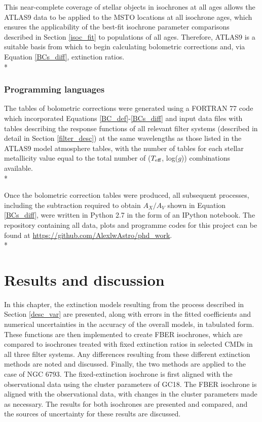 \documentclass[12pt, a4paper]{report}
\begin{document}
This near-complete coverage of stellar objects in isochrones at all ages allows the ATLAS9 data to be applied to the MSTO locations at all isochrone ages, which ensures the applicability of the best-fit isochrone parameter comparisons described in Section \ref{isoc_fit} to populations of all ages. Therefore, ATLAS9 is a suitable basis from which to begin calculating bolometric corrections and, via Equation \ref{BCs_diff}, extinction ratios. \\*



\subsection{Programming languages}
The tables of bolometric corrections were generated using a FORTRAN 77 code which incorporated Equations \ref{BC_def}-\ref{BCs_diff} and input data files with tables describing the response functions of all relevant filter systems (described in detail in Section \ref{filter_desc}) at the same wavelengths as those listed in the ATLAS9 model atmosphere tables, with the number of tables for each stellar metallicity value equal to the total number of ($T_{\textnormal{eff}}$, log($g$)) combinations available.\\*

Once the bolometric correction tables were produced, all subsequent processes, including the subtraction required to obtain $A_{X}/A_{V}$ shown in Equation \ref{BCs_diff}, were written in Python 2.7 in the form of an IPython notebook. The repository containing all data, plots and programme codes for this project can be found at \protect\url{https://github.com/AlexlwAstro/phd_work}.\\*



\chapter{Results and discussion}
In this chapter, the extinction models resulting from the process described in Section \ref{desc_var} are presented, along with errors in the fitted coefficients and numerical uncertainties in the accuracy of the overall models, in tabulated form. These functions are then implemented to create FBER isochrones, which are compared to isochrones treated with fixed extinction ratios in selected CMDs in all three filter systems. Any differences resulting from these different extinction methods are noted and discussed. Finally, the two methods are applied to the case of NGC 6793. The fixed-extinction isochrone is first aligned with the observational data using the cluster parameters of GC18. The FBER isochrone is aligned with the observational data, with changes in the cluster parameters made as necessary. The results for both isochrones are presented and compared, and the sources of uncertainty for these results are discussed.
\end{document}
